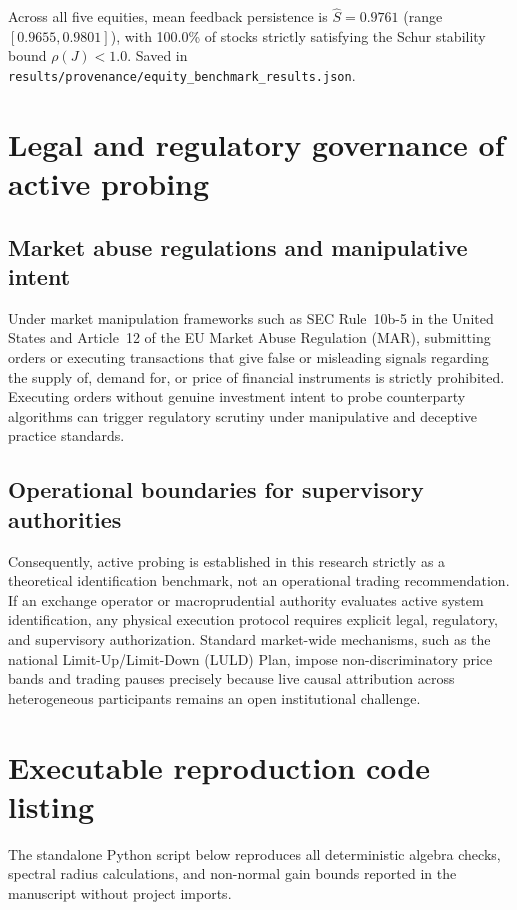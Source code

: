 \documentclass[11pt,a4paper]{article}
\theoremstyle{definition}\newtheorem{definition}[theorem]{Definition}
\theoremstyle{remark}\newtheorem{remark}[theorem]{Remark}
\begin{document}
Across all five equities, mean feedback persistence is $\hat S = 0.9761$ (range $[0.9655, 0.9801]$), with 100.0\% of stocks strictly satisfying the Schur stability bound $\rho(J) < 1.0$. Saved in \nolinkurl{results/provenance/equity_benchmark_results.json}.

\section{Legal and regulatory governance of active probing}
\label{sec:supp_legal}
\subsection{Market abuse regulations and manipulative intent}
Under market manipulation frameworks such as SEC Rule~10b-5 in the United States and Article~12 of the EU Market Abuse Regulation (MAR), submitting orders or executing transactions that give false or misleading signals regarding the supply of, demand for, or price of financial instruments is strictly prohibited. Executing orders without genuine investment intent to probe counterparty algorithms can trigger regulatory scrutiny under manipulative and deceptive practice standards.

\subsection{Operational boundaries for supervisory authorities}
Consequently, active probing is established in this research strictly as a theoretical identification benchmark, not an operational trading recommendation. If an exchange operator or macroprudential authority evaluates active system identification, any physical execution protocol requires explicit legal, regulatory, and supervisory authorization. Standard market-wide mechanisms, such as the national Limit-Up/Limit-Down (LULD) Plan, impose non-discriminatory price bands and trading pauses precisely because live causal attribution across heterogeneous participants remains an open institutional challenge.

\section{Executable reproduction code listing}
\label{sec:supp_code}
The standalone Python script below reproduces all deterministic algebra checks, spectral radius calculations, and non-normal gain bounds reported in the manuscript without project imports.
\end{document}
